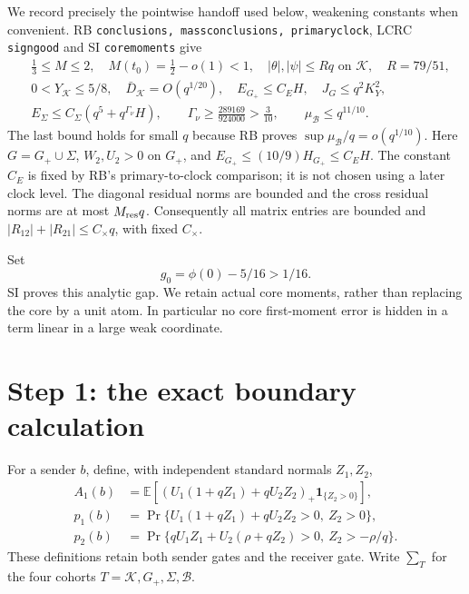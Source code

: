 \documentclass[11pt]{article}
\numberwithin{equation}{section}
\theoremstyle{remark}\newtheorem{remark}[theorem]{Remark}
\newcommand{\E}{\mathbb E}\newcommand{\dd}{\,d}
\newcommand{\one}{\mathbf1}\newcommand{\KK}{\mathcal K}
\newcommand{\BB}{\mathcal B}\newcommand{\Gp}{{G_+}}
\newcommand{\ph}{\phi(0)}\newcommand{\WW}{\mathcal W}
\begin{document}
We record precisely the pointwise handoff used below, weakening constants
when convenient. RB \texttt{conclusions, massconclusions, primaryclock},
LCRC \texttt{signgood} and SI \texttt{coremoments} give
\begin{align}
 &\tfrac13\le M\le2,\quad M(t_0)=\tfrac12-o(1)<1,
 \quad |\theta|,|\psi|\le Rq\text{ on }\KK,\quad R=79/51,
 \nonumber\\
 &0<Y_\KK\le5/8,\quad \bar D_\KK=O(q^{1/20}),
 \quad E_\Gp\le C_E H,\quad J_G\le q^2K_Y^2,
 \nonumber\\
 &E_\Sigma\le C_\Sigma(q^5+q^{\Gamma_\nu}H),\qquad
 \Gamma_\nu\ge\frac{289169}{924000}>\frac3{10},\qquad
 \mu_\BB\le q^{11/10}.
 \label{an03wbrv1:state}
\end{align}
The last bound holds for small $q$ because RB proves
$\sup\mu_\BB/q=o(q^{1/10})$. Here $G=\Gp\cup\Sigma$,
$W_2,U_2>0$ on $\Gp$, and $E_\Gp\le(10/9)H_\Gp\le C_EH$.
The constant $C_E$ is fixed by RB's primary-to-clock comparison;
it is not chosen using a later clock level. The diagonal residual norms
are bounded and the cross residual norms are at most $M_{\rm res}q$.
Consequently all matrix entries are bounded and
$|R_{12}|+|R_{21}|\le C_\times q$, with fixed $C_\times$.

Set
\begin{equation}
 g_0=\ph-5/16>1/16.
 \label{an03wbrv1:gap}
\end{equation}
SI proves this analytic gap. We retain actual core moments, rather than
replacing the core by a unit atom. In particular no core first-moment
error is hidden in a term linear in a large weak coordinate.

\section{Step 1: the exact boundary calculation}
\label{an03wbrv1:exactsection}
For a sender $b$, define, with independent standard normals $Z_1,Z_2$,
\begin{align*}
 A_1(b)&=\E[(U_1(1+qZ_1)+qU_2Z_2)_+\one_{\{Z_2>0\}}],\\
 p_1(b)&=\Pr\{U_1(1+qZ_1)+qU_2Z_2>0,\ Z_2>0\},\\
 p_2(b)&=\Pr\{qU_1Z_1+U_2(\rho+qZ_2)>0,\ Z_2>-\rho/q\}.
\end{align*}
These definitions retain both sender gates and the receiver gate.
Write $\sum_T$ for the four cohorts $T=\KK,\Gp,\Sigma,\BB$.
\end{document}
